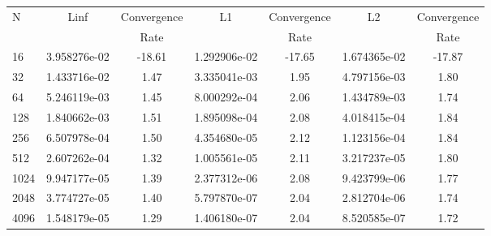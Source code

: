 \documentclass[12pt]{article}
\begin{document}
	\begin{tabular}{l|c|c|c|c|c|c}
		N&Linf&Convergence&L1&Convergence&L2&Convergence\\
		&&Rate&&Rate&&Rate\\
		\hline
		16&3.958276e-02&-18.61&1.292906e-02&-17.65&1.674365e-02&-17.87\\
		\hline
		32&1.433716e-02&1.47&3.335041e-03&1.95&4.797156e-03&1.80\\
		\hline
		64&5.246119e-03&1.45&8.000292e-04&2.06&1.434789e-03&1.74\\
		\hline
		128&1.840662e-03&1.51&1.895098e-04&2.08&4.018415e-04&1.84\\
		\hline
		256&6.507978e-04&1.50&4.354680e-05&2.12&1.123156e-04&1.84\\
		\hline
		512&2.607262e-04&1.32&1.005561e-05&2.11&3.217237e-05&1.80\\
		\hline
		1024&9.947177e-05&1.39&2.377312e-06&2.08&9.423799e-06&1.77\\
		\hline
		2048&3.774727e-05&1.40&5.797870e-07&2.04&2.812704e-06&1.74\\
		\hline
		4096&1.548179e-05&1.29&1.406180e-07&2.04&8.520585e-07&1.72\\
	\end{tabular}
\end{document}

